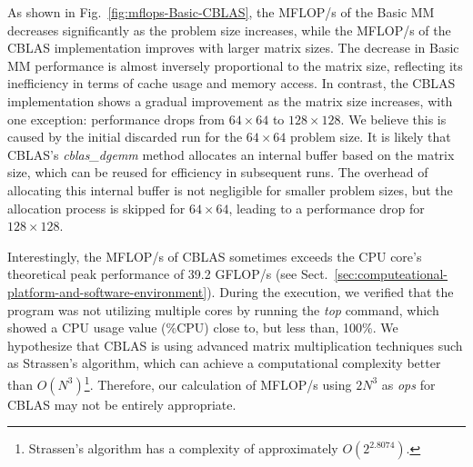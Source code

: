 As shown in Fig.~\ref{fig:mflops-Basic-CBLAS}, the MFLOP/s of the Basic MM decreases significantly as the problem size increases, while the MFLOP/s of the CBLAS implementation improves with larger matrix sizes. The decrease in Basic MM performance is almost inversely proportional to the matrix size, reflecting its inefficiency in terms of cache usage and memory access. In contrast, the CBLAS implementation shows a gradual improvement as the matrix size increases, with one exception: performance drops from \(64 \times 64\) to \(128 \times 128\). We believe this is caused by the initial discarded run for the \(64 \times 64\) problem size. It is likely that CBLAS’s \textit{cblas\_dgemm} method allocates an internal buffer based on the matrix size, which can be reused for efficiency in subsequent runs. The overhead of allocating this internal buffer is not negligible for smaller problem sizes, but the allocation process is skipped for \(64 \times 64\), leading to a performance drop for \(128 \times 128\).

Interestingly, the MFLOP/s of CBLAS sometimes exceeds the CPU core's theoretical peak performance of 39.2 GFLOP/s (see Sect.~\ref{sec:computeational-platform-and-software-environment}). During the execution, we verified that the program was not utilizing multiple cores by running the \textit{top} command, which showed a CPU usage value (\%CPU) close to, but less than, 100\%. We hypothesize that CBLAS is using advanced matrix multiplication techniques such as Strassen's algorithm, which can achieve a computational complexity better than \(O(N^3)\)\footnote{Strassen's algorithm has a complexity of approximately \(O(2^{2.8074})\).}. Therefore, our calculation of MFLOP/s using \(2N^3\) as \textit{ops} for CBLAS may not be entirely appropriate.

